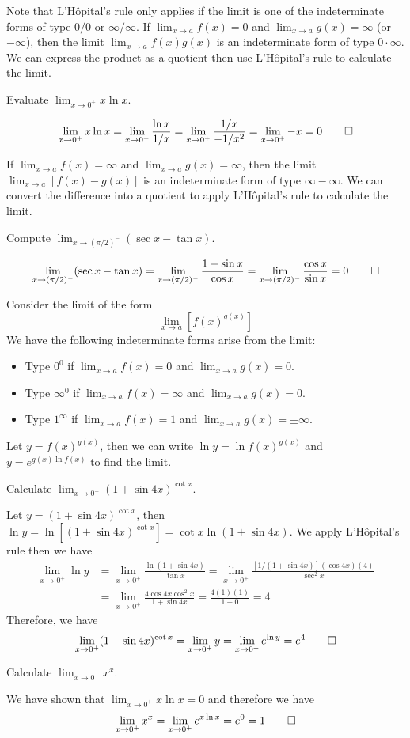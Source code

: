 Note that L'Hôpital's rule only applies if the limit is one of the
indeterminate forms of type \(0/0\) or \(\infty/\infty\).
If \(\lim_{x\to a}f(x)=0\) and \(\lim_{x\to a}g(x)=\infty\) (or \(-\infty\)),
then the limit \(\lim_{x\to a}f(x)g(x)\) is an indeterminate form of type
\(0\cdot\infty\).
We can express the product as a quotient then use L'Hôpital's rule to
calculate the limit.
\begin{problem}
    Evaluate \(\lim_{x\to 0^+}x\ln x\).
\end{problem}
\begin{solution}
    \[\lim_{x\to 0^+}x\ln x=\lim_{x\to 0^+}\frac{\ln x}{1/x}
    =\lim_{x\to 0^+}\frac{1/x}{-1/x^2}=\lim_{x\to 0^+}-x=0\qedhere\]
\end{solution}
If \(\lim_{x\to a}f(x)=\infty\) and \(\lim_{x\to a}g(x)=\infty\), then the
limit \(\lim_{x\to a}[f(x)-g(x)]\) is an indeterminate form of type
\(\infty-\infty\).
We can convert the difference into a quotient to apply L'Hôpital's rule to
calculate the limit.
\begin{problem}
    Compute \(\lim_{x\to (\pi/2)^-}(\sec x-\tan x)\).
\end{problem}
\begin{solution}
    \[\lim_{x\to (\pi/2)^-}(\sec x-\tan x)
    =\lim_{x\to (\pi/2)^-}\frac{1-\sin x}{\cos x}
    =\lim_{x\to (\pi/2)^-}\frac{\cos x}{\sin x}=0\qedhere\]
\end{solution}
Consider the limit of the form \[\lim_{x\to a}[f(x)^{g(x)}]\]
We have the following indeterminate forms arise from the limit:
\begin{itemize}
    \item Type \(0^0\) if \(\lim_{x\to a}f(x)=0\) and \(\lim_{x\to a}g(x)=0\).
    \item Type \(\infty^0\) if \(\lim_{x\to a}f(x)=\infty\) and
    \(\lim_{x\to a}g(x)=0\).
    \item Type \(1^\infty\) if \(\lim_{x\to a}f(x)=1\) and
    \(\lim_{x\to a}g(x)=\pm\infty\).
\end{itemize}
Let \(y=f(x)^{g(x)}\), then we can write \(\ln y=\ln f(x)^{g(x)}\) and
\(y=e^{g(x)\ln f(x)}\) to find the limit.
\begin{problem}
    Calculate \(\lim_{x\to 0^+}(1+\sin 4x)^{\cot x}\).
\end{problem}
\begin{solution}
    Let \(y=(1+\sin 4x)^{\cot x}\), then \(\ln y=\ln[(1+\sin 4x)^{\cot x}]=\cot x\ln(1+\sin 4x)\).
    We apply L'Hôpital's rule then we have
    \begin{align*}
    \lim_{x\to 0^+}\ln y &= \lim_{x\to 0^+}\frac{\ln(1+\sin 4x)}{\tan x}
    =\lim_{x\to 0^+}\frac{[1/(1+\sin 4x)](\cos 4x)(4)}{\sec^2 x} \\
    &= \lim_{x\to 0^+}\frac{4\cos 4x\cos^2 x}{1+\sin 4x}=\frac{4(1)(1)}{1+0}=4
    \end{align*}
    Therefore, we have
    \[\lim_{x\to 0^+}(1+\sin 4x)^{\cot x}=\lim_{x\to 0^+}y
    =\lim_{x\to 0^+}e^{\ln y}=e^4\qedhere\]
\end{solution}
\begin{problem}
    Calculate \(\lim_{x\to 0^+}x^x\).
\end{problem}
\begin{solution}
    We have shown that \(\lim_{x\to 0^+}x\ln x=0\) and therefore we have
    \[\lim_{x\to 0^+}x^x=\lim_{x\to 0^+}e^{x\ln x}=e^0=1\qedhere\]
\end{solution}